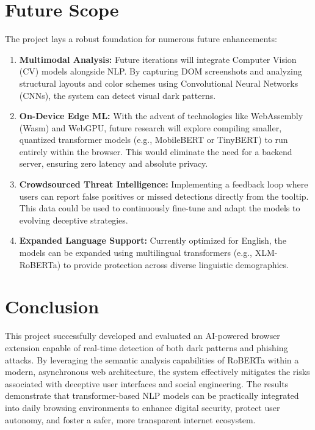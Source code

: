 \section{Future Scope}
The project lays a robust foundation for numerous future enhancements:
\begin{enumerate}
    \item \textbf{Multimodal Analysis:} Future iterations will integrate Computer Vision (CV) models alongside NLP. By capturing DOM screenshots and analyzing structural layouts and color schemes using Convolutional Neural Networks (CNNs), the system can detect visual dark patterns.
    \item \textbf{On-Device Edge ML:} With the advent of technologies like WebAssembly (Wasm) and WebGPU, future research will explore compiling smaller, quantized transformer models (e.g., MobileBERT or TinyBERT) to run entirely within the browser. This would eliminate the need for a backend server, ensuring zero latency and absolute privacy.
    \item \textbf{Crowdsourced Threat Intelligence:} Implementing a feedback loop where users can report false positives or missed detections directly from the tooltip. This data could be used to continuously fine-tune and adapt the models to evolving deceptive strategies.
    \item \textbf{Expanded Language Support:} Currently optimized for English, the models can be expanded using multilingual transformers (e.g., XLM-RoBERTa) to provide protection across diverse linguistic demographics.
\end{enumerate}

\section{Conclusion}
This project successfully developed and evaluated an AI-powered browser extension capable of real-time detection of both dark patterns and phishing attacks. By leveraging the semantic analysis capabilities of RoBERTa within a modern, asynchronous web architecture, the system effectively mitigates the risks associated with deceptive user interfaces and social engineering. The results demonstrate that transformer-based NLP models can be practically integrated into daily browsing environments to enhance digital security, protect user autonomy, and foster a safer, more transparent internet ecosystem.


